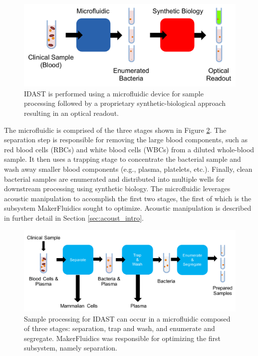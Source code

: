 \begin{figure}[h]
  \begin{minipage}[t]{0.99\linewidth}\centering
    \includegraphics[width=13cm]{idastFlow.pdf}
    \medskip
  \end{minipage}\hfill
  \caption[System-level view of IDAST]{IDAST is performed using a microfluidic device for sample processing followed by a proprietary synthetic-biological approach resulting in an optical readout.}
    \label{fig:idastFlow}
\end{figure}

The microfluidic is comprised of the three stages shown in Figure \ref{fig:idastUfFlow}. The separation step is responsible for removing the large blood components, such as red blood cells (RBCs) and white blood cells (WBCs) from a diluted whole-blood sample. It then uses a trapping stage to concentrate the bacterial sample and wash away smaller blood components (e.g., plasma, platelets, etc.). Finally, clean bacterial samples are enumerated and distributed into multiple wells for downstream processing using synthetic biology. The microfluidic leverages acoustic manipulation to accomplish the first two stages, the first of which is the subsystem MakerFluidics sought to optimize. Acoustic manipulation is described in further detail in Section \ref{sec:acoust_intro}.

\begin{figure}[h]
  \begin{minipage}[t]{0.99\linewidth}\centering
    \includegraphics[width=13cm]{idastUfFlow.pdf}
    \medskip
  \end{minipage}\hfill
  \caption[Block diagram of IDAST sample processing via microfluidics]{Sample processing for IDAST can occur in a microfluidic composed of three stages: separation, trap and wash, and enumerate and segregate. MakerFluidics was responsible for optimizing the first subsystem, namely separation.}
    \label{fig:idastUfFlow}
\end{figure}

